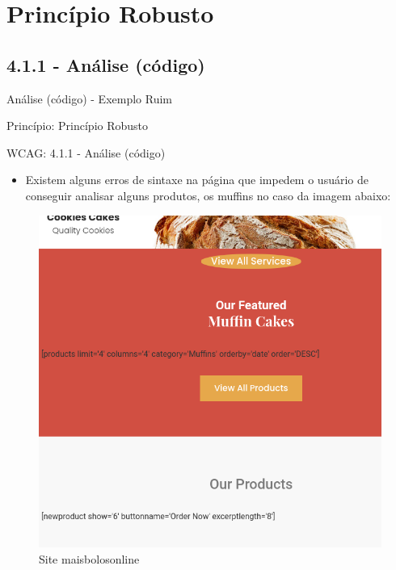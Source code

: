 \documentclass{beamer}
\begin{document}
\section{Princípio Robusto}
\subsection{4.1.1 - Análise (código)}

\begin{frame}{Análise (código) - Exemplo Ruim}

Princípio: Princípio Robusto

WCAG: 4.1.1 - Análise (código)

\begin{itemize}
	\item Existem alguns erros de sintaxe na página que impedem o usuário de conseguir analisar alguns produtos, os muffins no caso da imagem abaixo:
\end{itemize}
\begin{figure}
    \centering
    \includegraphics[scale=0.2]{images/no_code.png}
    \caption{Site maisbolosonline}
\end{figure}

\end{frame}
\end{document}
